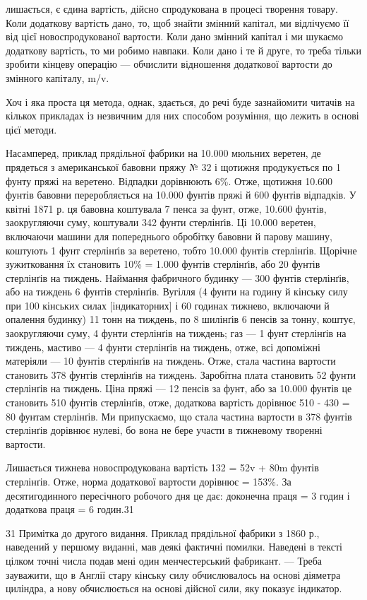 \parcont{}  %
лишається, є єдина вартість, дійсно спродукована в процесі творення товару. Коли додаткову вартість
дано, то, щоб знайти змінний капітал, ми відлічуємо її від цієї новоспродукованої вартости.
Коли дано змінний капітал і ми шукаємо додаткову вартість, то ми робимо навпаки. Коли дано і те й
друге, то треба тільки зробити кінцеву операцію — обчислити відношення додаткової вартости до
змінного капіталу, m/v.

Хоч і яка проста ця метода, однак, здається, до речі буде зазнайомити читачів на кількох прикладах
із незвичним для них
способом розуміння, що лежить в основі цієї методи.

Насамперед, приклад прядільної фабрики на 10.000 мюльних веретен, де прядеться з американської
бавовни пряжу № 32 і
щотижня продукується по 1 фунту пряжі на веретено. Відпадки дорівнюють 6\%. Отже, щотижня 10.600
фунтів бавовни переробляється на 10.000 фунтів пряжі й 600 фунтів відпадків. У квітні 1871 р. ця
бавовна коштувала 7 пенса за фунт, отже, 10.600 фунтів, заокругляючи суму, коштували 342 фунти
стерлінґів. Ці 10.000
веретен, включаючи машини для попереднього обробітку бавовни й парову машину, коштують 1 фунт
стерлінґів за веретено, тобто 10.000 фунтів стерлінґів. Щорічне зужитковання їх становить
10\% = 1.000 фунтів стерлінґів, або 20 фунтів стерлінґів на тиждень. Наймання фабричного будинку —
300 фунтів стерлінґів, або на тиждень 6 фунтів стерлінґів. Вугілля (4 фунти на годину
й кінську силу при 100 кінських силах [індикаторних] і 60 годинах тижнево, включаючи й опалення
будинку) 11 тонн
на тиждень, по 8 шилінґів 6 пенсів за тонну, коштує, заокругляючи суму, 4 фунти стерлінґів на
тиждень; газ — 1 фунт стерлінґів на тиждень, мастиво — 4 фунти стерлінґів на тиждень, отже, всі
допоміжні матеріяли — 10 фунтів стерлінґів на тиждень. Отже, стала частина вартости становить 378
фунтів стерлінґів
на тиждень. Заробітна плата становить 52 фунти стерлінґів на тиждень. Ціна пряжі — 12 пенсів за
фунт, або за 10.000 фунтів
це становить 510 фунтів стерлінґів, отже, додаткова вартість дорівнює 510 - 430 = 80 фунтам
стерлінґів. Ми припускаємо, що стала частина вартости в 378 фунтів стерлінґів дорівнює нулеві, бо
вона не бере участи в тижневому творенні вартости.

Лишається тижнева новоспродукована вартість 132 = 52v + 80m фунтів стерлінґів. Отже, норма
додаткової вартости дорівнює
 = 153\%. За десятигодинного пересічного робочого дня це дає: доконечна праця = 3
годин і додаткова праця = 6 годин.31

31 Примітка до другого видання. Приклад прядільної фабрики з 1860 р., наведений у першому виданні,
мав деякі фактичні помилки. Наведені в тексті цілком точні числа подав мені один менчестерський
фабрикант. — Треба зауважити, що в Англії стару кінську силу обчислювалось
на основі діяметра циліндра, а нову обчислюється на основі дійсної сили, яку показує індикатор.
